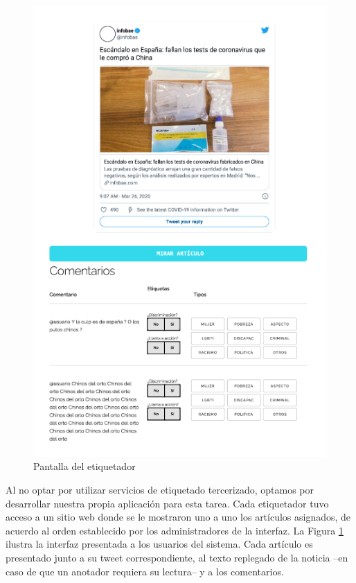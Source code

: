 \begin{figure}
    \centering
    \includegraphics[width=\textwidth]{img/labeler.pdf}
    \caption{Pantalla del etiquetador}
    \label{fig:labeler_example}
\end{figure}

Al no optar por utilizar servicios de etiquetado tercerizado, optamos por desarrollar nuestra propia aplicación para esta tarea. Cada etiquetador tuvo acceso a un sitio web donde se le mostraron uno a uno los artículos asignados, de acuerdo al orden establecido por los administradores de la interfaz. La Figura \ref{fig:labeler_example} ilustra la interfaz presentada a los usuarios del sistema. Cada artículo es presentado junto a su tweet correspondiente, al texto replegado de la noticia --en caso de que un anotador requiera su lectura-- y a los comentarios.

